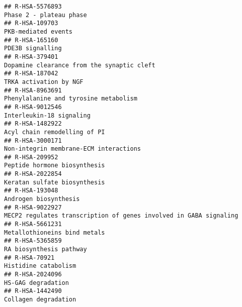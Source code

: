 \documentclass[
]{article}
\begin{document}
\begin{verbatim}
## R-HSA-5576893                                                                                                              Phase 2 - plateau phase
## R-HSA-109703                                                                                                                   PKB-mediated events
## R-HSA-165160                                                                                                                      PDE3B signalling
## R-HSA-379401                                                                                            Dopamine clearance from the synaptic cleft
## R-HSA-187042                                                                                                                TRKA activation by NGF
## R-HSA-8963691                                                                                                Phenylalanine and tyrosine metabolism
## R-HSA-9012546                                                                                                             Interleukin-18 signaling
## R-HSA-1482922                                                                                                         Acyl chain remodelling of PI
## R-HSA-3000171                                                                                               Non-integrin membrane-ECM interactions
## R-HSA-209952                                                                                                          Peptide hormone biosynthesis
## R-HSA-2022854                                                                                                         Keratan sulfate biosynthesis
## R-HSA-193048                                                                                                                 Androgen biosynthesis
## R-HSA-9022927                                                                    MECP2 regulates transcription of genes involved in GABA signaling
## R-HSA-5661231                                                                                                         Metallothioneins bind metals
## R-HSA-5365859                                                                                                              RA biosynthesis pathway
## R-HSA-70921                                                                                                                   Histidine catabolism
## R-HSA-2024096                                                                                                                   HS-GAG degradation
## R-HSA-1442490                                                                                                                 Collagen degradation

\end{verbatim}
\end{document}
